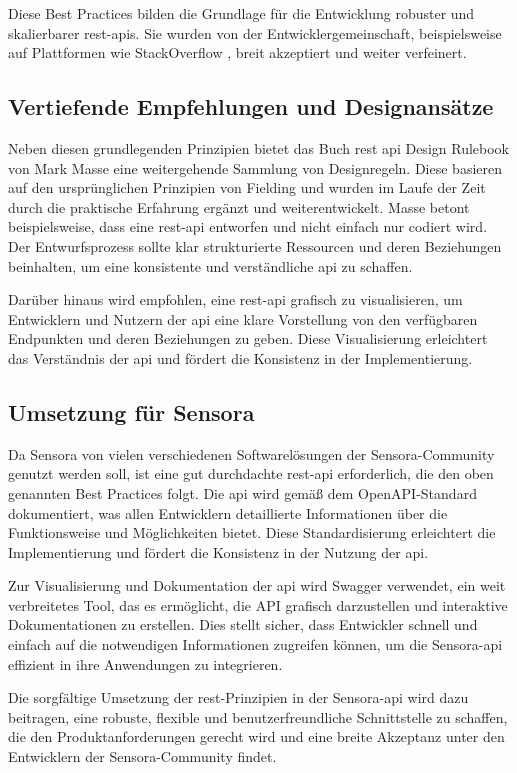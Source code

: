 Diese Best Practices bilden die Grundlage für die Entwicklung robuster und skalierbarer \ac{rest}-\acp{api}. Sie wurden von der Entwicklergemeinschaft, beispielsweise auf Plattformen wie StackOverflow \cite{JohnAuYeung2020}, breit akzeptiert und weiter verfeinert.

\subsection{Vertiefende Empfehlungen und Designansätze}
Neben diesen grundlegenden Prinzipien bietet das Buch \glqq\ac{rest} \ac{api} Design Rulebook\grqq{} von Mark Masse \cite{Masse2011} eine weitergehende Sammlung von Designregeln. Diese basieren auf den ursprünglichen Prinzipien von Fielding und wurden im Laufe der Zeit durch die praktische Erfahrung ergänzt und weiterentwickelt. Masse betont beispielsweise, dass eine \ac{rest}-\ac{api} entworfen und nicht einfach nur codiert wird. Der Entwurfsprozess sollte klar strukturierte Ressourcen und deren Beziehungen beinhalten, um eine konsistente und verständliche \ac{api} zu schaffen.

Darüber hinaus wird empfohlen, eine \ac{rest}-\ac{api} grafisch zu visualisieren, um Entwicklern und Nutzern der \ac{api} eine klare Vorstellung von den verfügbaren Endpunkten und deren Beziehungen zu geben. Diese Visualisierung erleichtert das Verständnis der \ac{api} und fördert die Konsistenz in der Implementierung.

\subsection{Umsetzung für Sensora}
Da Sensora von vielen verschiedenen Softwarelösungen der Sensora-Community genutzt werden soll, ist eine gut durchdachte \ac{rest}-\ac{api} erforderlich, die den oben genannten Best Practices folgt. Die \ac{api} wird gemäß dem OpenAPI-Standard dokumentiert, was allen Entwicklern detaillierte Informationen über die Funktionsweise und Möglichkeiten bietet. Diese Standardisierung erleichtert die Implementierung und fördert die Konsistenz in der Nutzung der \ac{api}.

Zur Visualisierung und Dokumentation der \ac{api} wird Swagger verwendet, ein weit verbreitetes Tool, das es ermöglicht, die API grafisch darzustellen und interaktive Dokumentationen zu erstellen. Dies stellt sicher, dass Entwickler schnell und einfach auf die notwendigen Informationen zugreifen können, um die Sensora-\ac{api} effizient in ihre Anwendungen zu integrieren.

Die sorgfältige Umsetzung der \ac{rest}-Prinzipien in der Sensora-\ac{api} wird dazu beitragen, eine robuste, flexible und benutzerfreundliche Schnittstelle zu schaffen, die den Produktanforderungen gerecht wird und eine breite Akzeptanz unter den Entwicklern der Sensora-Community findet.
